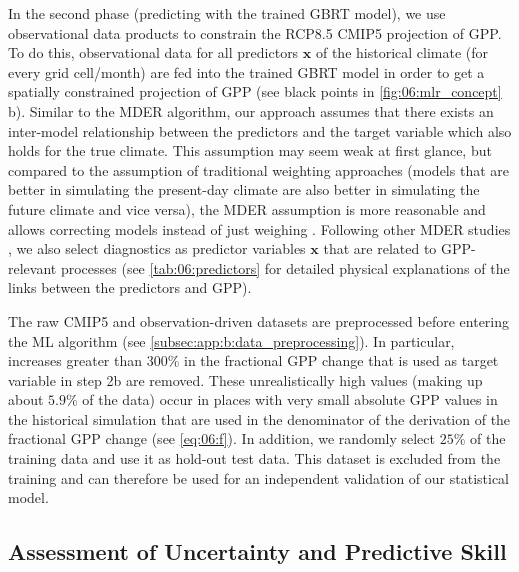 In the second phase (predicting with the trained \ac{GBRT} model), we use
observational data products to constrain the \acs{RCP}8.5 \acs{CMIP}5
projection of \ac{GPP}. To do this, observational data for all predictors
$\bm{x}$ of the historical climate (for every grid cell/month) are fed into the
trained \ac{GBRT} model in order to get a spatially constrained projection of
\ac{GPP} (see black points in \cref{fig:06:mlr_concept}{\color{BrownRed} b}).
Similar to the \ac{MDER} algorithm, our approach assumes that there exists an
inter-model relationship between the predictors and the target variable which
also holds for the true climate. This assumption may seem weak at first glance,
but compared to the assumption of traditional weighting approaches (models that
are better in simulating the present-day climate are also better in simulating
the future climate and vice versa), the \ac{MDER} assumption is more reasonable
and allows correcting models instead of just weighing
. Following other
\ac{MDER} studies \autocite{Karpechko2013, Senftleben2020, Wenzel2016a}, we
also select diagnostics as predictor variables $\bm{x}$ that are related to
\ac{GPP}-relevant processes (see \cref{tab:06:predictors} for detailed physical
explanations of the links between the predictors and \ac{GPP}).

The raw \acs{CMIP}5 and observation-driven datasets are preprocessed before
entering the \ac{ML} algorithm (see \cref{subsec:app:b:data_preprocessing}). In
particular, increases greater than $300 \unit{\%}$ in the fractional \ac{GPP}
change that is used as target variable in step 2b are removed. These
unrealistically high values (making up about $5.9 \unit{\%}$ of the data) occur
in places with very small absolute \ac{GPP} values in the historical simulation
that are used in the denominator of the derivation of the fractional \ac{GPP}
change (see \cref{eq:06:f}). In addition, we randomly select $25 \unit{\%}$ of
the training data and use it as hold-out test data. This dataset is excluded
from the training and can therefore be used for an independent validation of
our statistical model.


\subsection{Assessment of Uncertainty and Predictive Skill}
\label{subsec:06:uncertainty_and_skill}

